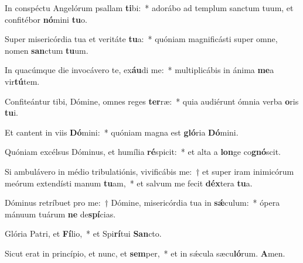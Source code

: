 \item In conspéctu Angelórum psallam \textbf{ti}bi:~* adorábo ad templum sanctum tuum, et confitébor \textbf{nó}mini \textbf{tu}o.
\item Super misericórdia tua et veritáte \textbf{tu}a:~* quóniam magnificásti super omne, nomen \textbf{san}ctum \textbf{tu}um.
\item In quacúmque die invocávero te, ex\textbf{áu}di me:~* multiplicábis in ánima \textbf{me}a vir\textbf{tú}tem.
\item Confiteántur tibi, Dómine, omnes reges \textbf{ter}ræ:~* quia audiérunt ómnia verba \textbf{o}ris \textbf{tu}i.
\item Et cantent in viis \textbf{Dó}mini:~* quóniam magna est \textbf{gló}ria \textbf{Dó}mini.
\item Quóniam excélsus Dóminus, et humília \textbf{ré}spicit:~* et alta a \textbf{lon}ge co\textbf{gnó}scit.
\item Si ambulávero in médio tribulatiónis, vivificábis me:~† et super iram inimicórum meórum extendísti manum \textbf{tu}am,~* et salvum me fecit \textbf{déx}tera \textbf{tu}a.
\item Dóminus retríbuet pro me:~† Dómine, misericórdia tua in \textbf{sǽ}culum:~* ópera mánuum tuárum \textbf{ne} de\textbf{spí}cias.
\item Glória Patri, et \textbf{Fí}lio,~* et Spi\textbf{rí}tui \textbf{San}cto.
\item Sicut erat in princípio, et nunc, et \textbf{sem}per,~* et in sǽcula sæcu\textbf{ló}rum. \textbf{A}men.
